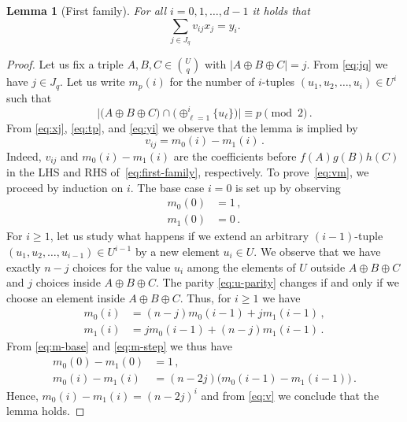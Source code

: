 \documentclass{amsart}
\newtheorem{Lem}{Lemma}
\begin{document}
\begin{Lem}[First family]
\label{lem:first}
For all $i=0,1,\ldots,d-1$ it holds that 
\begin{equation}
\label{eq:first-family}
\sum_{j\in J_q}v_{ij}x_j=y_i.
\end{equation}
\end{Lem}
\begin{proof}
Let us fix a triple $A,B,C\in\binom{U}{q}$ with 
$|A\oplus B\oplus C|=j$. From \eqref{eq:jq} we have $j\in J_q$.
Let us write $m_p(i)$ for the
number of $i$-tuples $(u_1,u_2,\ldots,u_i)\in U^i$ 
such that 
\begin{equation}
\label{eq:u-parity}
\bigl|\bigl(A\oplus B\oplus C\bigr)\cap\bigl(\oplus_{\ell=1}^i\{u_\ell\}\bigr)\bigr|\equiv p\pmod 2\,.
\end{equation}
From \eqref{eq:xj}, \eqref{eq:tp}, and \eqref{eq:yi} we observe 
that the lemma is implied by
\begin{equation}
\label{eq:vm}
v_{ij}=m_0(i)-m_1(i)\,.
\end{equation}
Indeed, $v_{ij}$ and $m_0(i)-m_1(i)$ are the coefficients before $f(A)g(B)h(C)$ in the LHS and RHS of~\eqref{eq:first-family}, respectively.
To prove~\eqref{eq:vm}, we proceed by induction on $i$. The base case $i=0$ is set up by
observing
\begin{equation}
\label{eq:m-base}
\begin{split}
m_0(0)&=1\,,\\
m_1(0)&=0\,.
\end{split}
\end{equation}
For $i\geq 1$, let us study what happens if we extend
an arbitrary $(i-1)$-tuple $(u_1,u_2,\ldots,u_{i-1})\in U^{i-1}$
by a new element $u_i\in U$. We observe that we have exactly $n-j$ 
choices for the value $u_i$ among the elements of $U$ outside 
$A\oplus B\oplus C$ and $j$ choices inside $A\oplus B\oplus C$. 
The parity \eqref{eq:u-parity} changes if and only if 
we choose an element inside $A\oplus B\oplus C$.
Thus, for $i\geq 1$ we have
\begin{equation}
\label{eq:m-step}
\begin{split}
   m_0(i)&=(n-j) m_0({i-1}) + jm_1(i-1)\,,\\
   m_1(i)&=j m_0({i-1}) + (n-j)m_1({i-1})\,.
\end{split}
\end{equation}
From \eqref{eq:m-base} and \eqref{eq:m-step} we thus have
\[
\begin{split}
  m_0(0)-m_1(0) &= 1\,,\\ 
  m_0(i)-m_1(i) &= (n-2j)\bigl(m_0({i-1})-m_1({i-1})\bigr)\,.
\end{split}
\]
Hence, $m_0(i)-m_1(i)=(n-2j)^i$ and from \eqref{eq:v} we conclude that the
lemma holds.

\end{proof}
\end{document}
